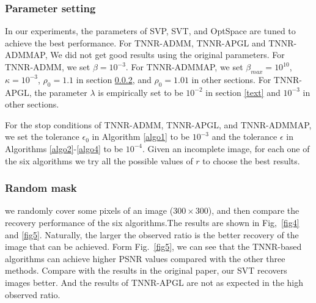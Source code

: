 \documentclass{article}
\begin{document}
{\subsubsection{Parameter setting}
In our experiments, the parameters of SVP, SVT, and OptSpace are tuned to achieve the best performance. For TNNR-ADMM, TNNR-APGL and TNNR-ADMMAP, We did not get good results using the original parameters. For TNNR-ADMM, we set $\beta = 10^{-3}$. For TNNR-ADMMAP, we set $\beta_{max} = 10^{10}$, $\kappa = 10^{-3}$, $\rho_0 = 1.1$ in section \ref{random}, and $\rho_0 = 1.01$ in other sections. For TNNR-APGL, the parameter $\lambda$ is empirically set to be $10^{-2}$ in section \ref{text} and $10^{-3}$ in other sections.
  
For the stop conditions of TNNR-ADMM, TNNR-APGL, and TNNR-ADMMAP, we set the tolerance $\epsilon_0$ in Algorithm \ref{algo1} to be $10^{-3}$ and the tolerance $\epsilon$ in Algorithms \ref{algo2}-\ref{algo4} to be $10^{-4}$. Given an incomplete image, for each one of the six algorithms we try all the possible values of $r$ to choose the best results.

\subsubsection{Random mask}
\label{random}
we randomly cover some pixels of an image ($300 \times 300$), and then compare the recovery performance of the six algorithms.The results are shown in Fig,~\ref{fig4} and \ref{fig5}. Naturally, the larger the observed ratio is the better recovery of the image that can be achieved. Form Fig.~\ref{fig5}, we can see that the TNNR-based algorithms can achieve higher PSNR values compared with the other three methods. Compare with the results in the original paper, our SVT recovers images better. And the results of TNNR-APGL are not as expected in the high observed ratio.

}
\end{document}
